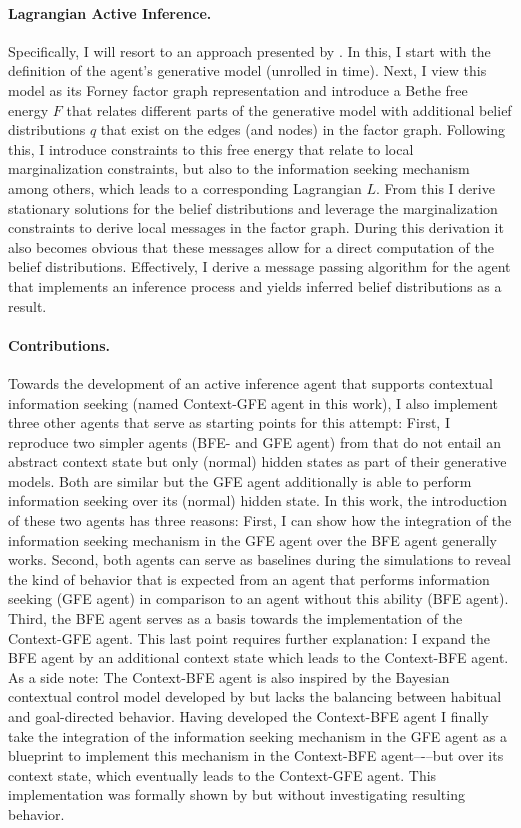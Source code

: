 \paragraph{Lagrangian Active Inference.}
Specifically, I will resort to an approach presented by \textcite{senoez2021,delaar2023,delaar2025}. In this, I start with the definition of the agent's generative model (unrolled in time). Next, I view this model as its Forney factor graph representation and introduce a Bethe free energy \(F\) that relates different parts of the generative model with additional belief distributions \(q\) that exist on the edges (and nodes) in the factor graph. Following this, I introduce constraints to this free energy that relate to local marginalization constraints, but also to the information seeking mechanism among others, which leads to a corresponding Lagrangian \(L\). From this I derive stationary solutions for the belief distributions and leverage the marginalization constraints to derive local messages in the factor graph. During this derivation it also becomes obvious that these messages allow for a direct computation of the belief distributions. Effectively, I derive a message passing algorithm for the agent that implements an inference process and yields inferred belief distributions as a result.

\paragraph{Contributions.}
Towards the development of an active inference agent that supports contextual information seeking (named Context-GFE agent in this work), I also implement three other agents that serve as starting points for this attempt: First, I reproduce two simpler agents (BFE- and GFE agent) from \textcite{schwoebel2018,delaar2023} that do not entail an abstract context state but only (normal) hidden states as part of their generative models. Both are similar but the GFE agent additionally is able to perform information seeking over its (normal) hidden state. In this work, the introduction of these two agents has three reasons: First, I can show how the integration of the information seeking mechanism in the GFE agent over the BFE agent generally works. Second, both agents can serve as baselines during the simulations to reveal the kind of behavior that is expected from an agent that performs information seeking (GFE agent) in comparison to an agent without this ability (BFE agent). Third, the BFE agent serves as a basis towards the implementation of the Context-GFE agent. This last point requires further explanation: I expand the BFE agent by an additional context state which leads to the Context-BFE agent. As a side note: The Context-BFE agent is also inspired by the Bayesian contextual control model developed by \textcite{schwoebel2021} but lacks the balancing between habitual and goal-directed behavior. Having developed the Context-BFE agent I finally take the integration of the information seeking mechanism in the GFE agent as a blueprint to implement this mechanism in the Context-BFE agent–-–but over its context state, which eventually leads to the Context-GFE agent. This implementation was formally shown by \textcite{delaar2025} but without investigating resulting behavior.


